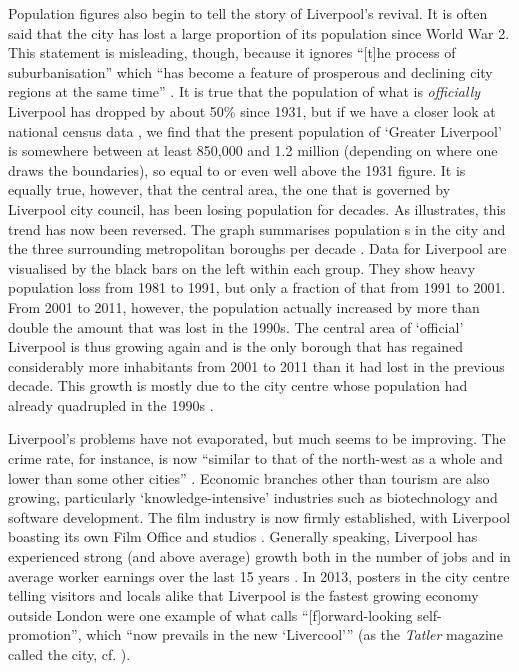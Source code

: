 Population figures also begin to tell the story of Liverpool's revival.
It is often said that the city has lost a large proportion of its population since World War 2.
This statement is misleading, though, because it ignores ``[t]he process of suburbanisation'' which ``has become a feature of prosperous and declining city regions at the same time'' \citep[21]{fraser2003}.
It is true that the population of what is \emph{officially} Liverpool has dropped by about 50\% since 1931, but if we have a closer look at national census data \parencite{nomis}, we find that the present population of `Greater Liverpool' is somewhere between at least 850,000 and 1.2 million (depending on where one draws the boundaries), so equal to or even well above the 1931 figure.
It is equally true, however, that the central area, the one that is governed by Liverpool city council, has been losing population for decades.
As  illustrates, this trend has now been reversed.
The graph summarises population s in the city and the three surrounding metropolitan boroughs per decade \parencite{nomis}.
Data for Liverpool are visualised by the black bars on the left within each group.
They show heavy population loss from 1981 to 1991, but only a fraction of that from 1991 to 2001.
From 2001 to 2011, however, the population actually increased by more than double the amount that was lost in the 1990s.
The central area of `official' Liverpool is thus growing again and is the only borough that has regained considerably more inhabitants from 2001 to 2011 than it had lost in the previous decade.
This growth is mostly due to the city centre whose population had already quadrupled in the 1990s \citep[cf.][xix]{belchem2006c}.

Liverpool's problems have not evaporated, but much seems to be improving.
The crime rate, for instance, is now ``similar to that of the north-west as a whole and lower than some other cities''  \citep[235]{pooley2006}.
Economic branches other than tourism are also growing, particularly `knowledge-intensive' industries such as biotechnology \citep[cf.][204]{percy2003} and software development.
The film industry is now firmly established, with Liverpool boasting its own Film Office and studios \parencite[cf.][478--480]{murden2006}.
Generally speaking, Liverpool has experienced strong (and above average) growth both in the number of jobs and in average worker earnings over the last 15 years \parencite[cf.][4]{lcc2016}.
In 2013, posters in the city centre telling visitors and locals alike that Liverpool is the fastest growing economy outside London were one example of what \citet[54]{belchem2006a} calls ``[f]orward-looking self-promotion'', which ``now prevails in the new `Livercool'{}'' (as the \emph{Tatler} magazine called the city, cf. \citealt[484]{murden2006}).

